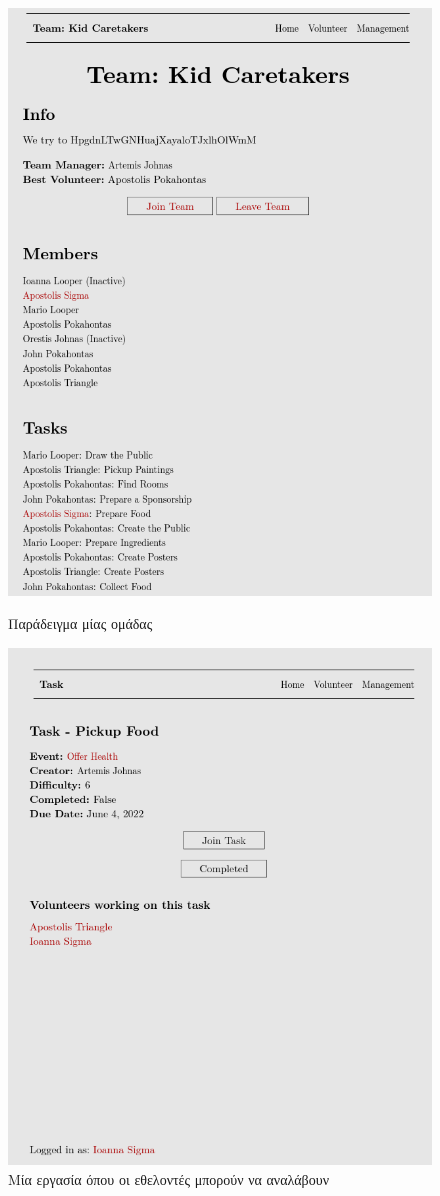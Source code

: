 \documentclass[manuscript,screen,review]{acmart}
\begin{document}
\begin{figure}[H]
 \centering
    \includegraphics[width=.5\textwidth]{./images/teamExample.png}
    \caption{Παράδειγμα μίας ομάδας}
\centering
    \includegraphics[width=.5\textwidth]{./images/joinTask.png}
    \caption{Μία εργασία όπου οι εθελοντές μπορούν να αναλάβουν }
   
\end{figure}
\end{document}
